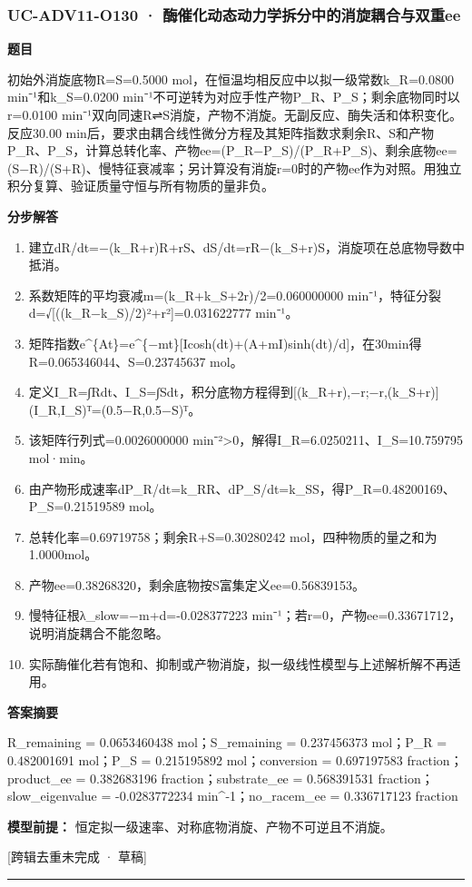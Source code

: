 \documentclass[UTF8,11pt,a4paper]{ctexart}
\begin{document}
\subsubsection*{UC-ADV11-O130 · 酶催化动态动力学拆分中的消旋耦合与双重ee}
\noindent\textbf{题目}\par
初始外消旋底物R=S=0.5000 mol，在恒温均相反应中以拟一级常数k\_R=0.0800 min⁻¹和k\_S=0.0200 min⁻¹不可逆转为对应手性产物P\_R、P\_S；剩余底物同时以r=0.0100 min⁻¹双向同速R⇌S消旋，产物不消旋。无副反应、酶失活和体积变化。反应30.00 min后，要求由耦合线性微分方程及其矩阵指数求剩余R、S和产物P\_R、P\_S，计算总转化率、产物ee=(P\_R−P\_S)/(P\_R+P\_S)、剩余底物ee=(S−R)/(S+R)、慢特征衰减率；另计算没有消旋r=0时的产物ee作为对照。用独立积分复算、验证质量守恒与所有物质的量非负。\par
\medskip\noindent\textbf{分步解答}
\begin{enumerate}
\item 建立dR/dt=−(k\_R+r)R+rS、dS/dt=rR−(k\_S+r)S，消旋项在总底物导数中抵消。
\item 系数矩阵的平均衰减m=(k\_R+k\_S+2r)/2=0.060000000 min⁻¹，特征分裂d=√[((k\_R−k\_S)/2)²+r²]=0.031622777 min⁻¹。
\item 矩阵指数e\textasciicircum{}\{At\}=e\textasciicircum{}\{−mt\}[Icosh(dt)+(A+mI)sinh(dt)/d]，在30min得R=0.065346044、S=0.23745637 mol。
\item 定义I\_R=∫Rdt、I\_S=∫Sdt，积分底物方程得到[(k\_R+r),−r;−r,(k\_S+r)](I\_R,I\_S)ᵀ=(0.5−R,0.5−S)ᵀ。
\item 该矩阵行列式=0.0026000000 min⁻²>0，解得I\_R=6.0250211、I\_S=10.759795 mol·min。
\item 由产物形成速率dP\_R/dt=k\_RR、dP\_S/dt=k\_SS，得P\_R=0.48200169、P\_S=0.21519589 mol。
\item 总转化率=0.69719758；剩余R+S=0.30280242 mol，四种物质的量之和为1.0000mol。
\item 产物ee=0.38268320，剩余底物按S富集定义ee=0.56839153。
\item 慢特征根λ\_slow=−m+d=-0.028377223 min⁻¹；若r=0，产物ee=0.33671712，说明消旋耦合不能忽略。
\item 实际酶催化若有饱和、抑制或产物消旋，拟一级线性模型与上述解析解不再适用。
\end{enumerate}
\noindent\textbf{答案摘要}\par
R\_remaining = 0.0653460438 mol；S\_remaining = 0.237456373 mol；P\_R = 0.482001691 mol；P\_S = 0.215195892 mol；conversion = 0.697197583 fraction；product\_ee = 0.382683196 fraction；substrate\_ee = 0.568391531 fraction；slow\_eigenvalue = -0.0283772234 min\textasciicircum{}-1；no\_racem\_ee = 0.336717123 fraction\par
\noindent\textbf{模型前提：}
恒定拟一级速率、对称底物消旋、产物不可逆且不消旋。\par
\noindent\textcolor{red!65!black}{[跨辑去重未完成 · 草稿]} \par
\medskip\hrule\medskip
{}
\end{document}
